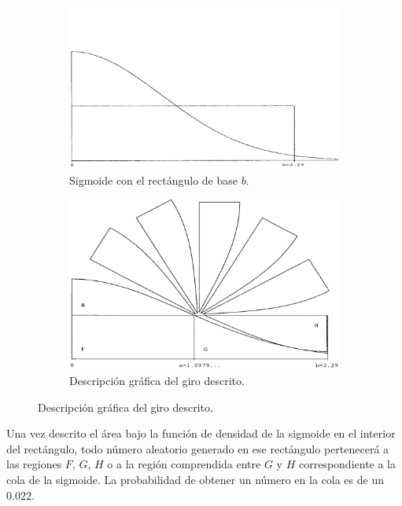 \documentclass[a4paper,12pt]{article}
\begin{document}
	\begin{figure}[H]
		\begin{subfigure}{.5\textwidth}
			\centering
			\includegraphics[width=\textwidth]{include/sigmoid_w_square.png}
			\caption{Sigmoide con el rectángulo de base $b$. \cite{monty-python}}
		\end{subfigure}
		\begin{subfigure}{.5\textwidth}
			\centering
			\includegraphics[width=\textwidth]{include/rotating_sigmoid.png}
			\caption{Descripción gráfica del giro descrito. \cite{monty-python}}
		\end{subfigure}
	\end{figure}
	
	Una vez descrito el área bajo la función de densidad de la sigmoide en el interior del rectángulo, todo número aleatorio generado en ese rectángulo pertenecerá a las regiones $F$, $G$, $H$ o a la región comprendida entre $G$ y $H$ correspondiente a la cola de la sigmoide. La probabilidad de obtener un número en la cola es de un $0.022$.
	
\end{document}
